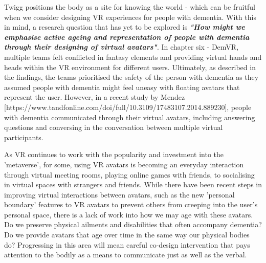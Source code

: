 Twigg positions the body as a site for knowing the world - which can be fruitful when we consider designing VR experiences for people with dementia. With this in mind, a research question that has yet to be explored is \textbf{\textit{"How might we emphasise active ageing and representation of people with dementia through their designing of virtual avatars"}}. In chapter six - DemVR, multiple teams felt conflicted in fantasy elements and providing virtual hands and heads within the VR environment for different users. Ultimately, as described in the findings, the teams prioritised the safety of the person with dementia as they assumed people with dementia might feel uneasy with floating avatars that represent the user. However, in a recent study by Mendez [https://www.tandfonline.com/doi/full/10.3109/17483107.2014.889230], people with dementia communicated through their virtual avatars, including answering questions and conversing in the conversation between multiple virtual participants.

As VR continues to work with the popularity and investment into the 'metaverse', for some, using VR avatars is becoming an everyday interaction through virtual meeting rooms, playing online games with friends, to socialising in virtual spaces with strangers and friends. While there have been recent steps in improving virtual interactions between avatars, such as the new 'personal boundary' features to VR avatars to prevent others from creeping into the user's personal space, there is a lack of work into how we may age with these avatars. Do we preserve physical ailments and disabilities that often accompany dementia? Do we provide avatars that age over time in the same way our physical bodies do? Progressing in this area will mean careful co-design intervention that pays attention to the bodily as a means to communicate just as well as the verbal.


